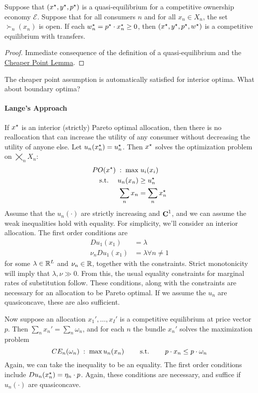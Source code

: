\documentclass[10pt]{article}
\begin{document}
\begin{theorem}
	 Suppose that $(x^\star,y^\star,p^\star)$ is a quasi-equilibrium for a competitive ownership economy $\mathcal{E}$. Suppose that for all consumers $n$ and for all $x_n \in X_n$, the set $\succ_n(x_n)$ is open. If each $w_n^\star = p^\star \cdot x_n^\star \ge 0$, then $(x^\star,y^\star,p^\star,w^\star)$ is a competitive equilibrium with transfers. 
\end{theorem}
\begin{proof}
	Immediate consequence of the definition of a quasi-equilibrium and the \href{lem:cheaper_point}{Cheaper Point Lemma}.
\end{proof}
\begin{remark}
	The cheaper point assumption is automatically satisfied for interior optima. What about boundary optima?
\end{remark}

\paragraph{Lange's Approach} If $x^\star$ is an interior (strictly) Pareto optimal allocation, then there is no reallocation that can increase the utility of any consumer without decreasing the utility of anyone else. Let $u_n(x_n^\star) = u_n^\star$. Then $x^\star$ solves the optimization problem on $\bigtimes_n X_n$:
\begin{align*}
	PO(x^\star) \;:\; \max &\;u_i(x_i) \\\;\text{s.t.}\; \quad u_n(x_n) &\ge u_n^\star \\\sum_n x_n &= \sum_n x_n^\star
\end{align*}
Assume that the $u_n(\cdot)$ are strictly increasing and $\mathop{\bf C}^1$, and we can assume the weak inequalities hold with equality. For simplicity, we'll consider an interior allocation. The first order conditions are
\begin{align*}
	Du_1(x_1) &= \lambda \\ \nu_n Du_1(x_1) &= \lambda \forall n \ne 1
\end{align*}
for some $\lambda \in \mathbb{R}^L$ and $\nu_n \in \mathbb{R}$, together with the constraints. Strict monotonicity will imply that $\lambda,\nu \gg 0$. From this, the usual equality constraints for marginal rates of substitution follow. These conditions, along with the constraints are necessary for an allocation to be Pareto optimal. If we assume the $u_n$ are quasiconcave, these are also sufficient.

Now suppose an allocation $x_1',\dots,x_I'$ is a competitive equilibrium at price vector $p$. Then $\sum_n x_n' = \sum_n \omega_n$, and for each $n$ the bundle $x_n'$ solves the maximization problem \[CE_n(\omega_n) \;:\; \max u_n(x_n) \qquad \;\text{s.t.}\; \qquad p \cdot x_n \le p \cdot \omega_n\]Again, we can take the inequality to be an equality. The first order conditions include $Du_n(x^\star_n) = \eta_n \cdot p$. Again, these conditions are necessary, and suffice if $u_n(\cdot)$ are quasiconcave.
\end{document}
